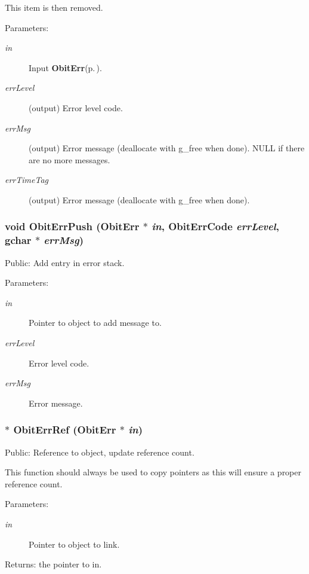 This item is then removed. \begin{Desc}
\item[Parameters:]
\begin{description}
\item[{\em in}]Input {\bf Obit\-Err}{\rm (p.\,\pageref{structObitErr})}. \item[{\em err\-Level}](output) Error level code. \item[{\em err\-Msg}](output) Error message (deallocate with g\_\-free when done). NULL if there are no more messages. \item[{\em err\-Time\-Tag}](output) Error message (deallocate with g\_\-free when done). \end{description}
\end{Desc}
\subsubsection{\setlength{\rightskip}{0pt plus 5cm}void Obit\-Err\-Push ({\bf Obit\-Err} $\ast$ {\em in}, {\bf Obit\-Err\-Code} {\em err\-Level}, gchar $\ast$ {\em err\-Msg})}\label{ObitErr_8h_a21}


Public: Add entry in error stack. 

\begin{Desc}
\item[Parameters:]
\begin{description}
\item[{\em in}]Pointer to object to add message to. \item[{\em err\-Level}]Error level code. \item[{\em err\-Msg}]Error message. \end{description}
\end{Desc}
\subsubsection{$\ast$ Obit\-Err\-Ref ({\bf Obit\-Err} $\ast$ {\em in})}\label{ObitErr_8h_a17}


Public: Reference to object, update reference count. 

This function should always be used to copy pointers as this will ensure a proper reference count. \begin{Desc}
\item[Parameters:]
\begin{description}
\item[{\em in}]Pointer to object to link. \end{description}
\end{Desc}
\begin{Desc}
\item[Returns:]the pointer to in. \end{Desc}
